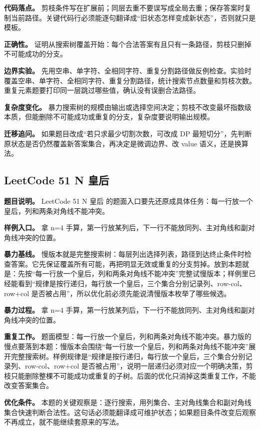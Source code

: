 \textbf{代码落点。} 剪枝条件写在扩展前；同层去重不要误写成全局去重；保存答案时复制当前路径。关键代码行必须能逐句翻译成“旧状态怎样变成新状态”，否则就只是模板。

\textbf{正确性。} 证明从搜索树覆盖开始：每个合法答案有且只有一条路径，剪枝只删掉不可能成功的分支。

\textbf{边界实验。} 先用空串、单字符、全相同字符、重复分割路径做反例检查。实验时覆盖空串、单字符、全相同字符、重复分割路径，统计搜索节点数量和剪枝次数。重复元素题要打印同一层跳过哪些值，确认没有误删合法路径。

\textbf{复杂度变化。} 暴力搜索树的规模由输出或选择空间决定；剪枝不改变最坏指数级本质，但能删除不可能成功或重复的分支，复杂度要说明输出规模。

\textbf{迁移追问。} 如果题目改成“若只求最少切割次数，可改成 DP 最短切分”，先判断原状态是否仍然覆盖新答案集合，再决定是微调边界、改 value 语义，还是换算法。

\subsection{LeetCode 51 N 皇后}

\textbf{题目说明。} LeetCode 51 N 皇后 的题面入口要先还原成具体任务：每一行放一个皇后，列和两条对角线不能冲突。

\textbf{样例入口。} 拿 n=4 手算，第一行放某列后，下一行不能放同列、主对角线和副对角线冲突的位置。

\textbf{暴力基线。} 慢版本就是完整搜索树：每层列出选择列表，路径到达终止条件时检查答案。它先保证覆盖所有可能，再把明显无效或重复的分支剪掉。放到本题就是：先按“每一行放一个皇后，列和两条对角线不能冲突”完整试慢版本；样例里已经能看到“规律是按行递归，每行放一个皇后，三个集合分别记录列、row-col、row+col 是否被占用”，所以优化前必须先能说清慢版本枚举了哪些候选。

\textbf{暴力过程。} 拿 n=4 手算，第一行放某列后，下一行不能放同列、主对角线和副对角线冲突的位置。

\textbf{重复工作。} 题面模型：每一行放一个皇后，列和两条对角线不能冲突。暴力版的慢点要落到本题：慢版本会围绕“每一行放一个皇后，列和两条对角线不能冲突”展开完整搜索树。样例规律是“规律是按行递归，每行放一个皇后，三个集合分别记录列、row-col、row+col 是否被占用”，说明一层递归必须对应一个明确决策，剪枝只能删除整棵不可能成功或重复的子树。后面的优化只消掉这类重复工作，不能改变答案集合。

\textbf{优化条件。} 本题的关键观察是：逐行搜索，用列集合、主对角线集合和副对角线集合快速判断合法性。这句话必须能翻译成可维护状态；如果题目条件改变后观察不再成立，就不能继续套原来的写法。

